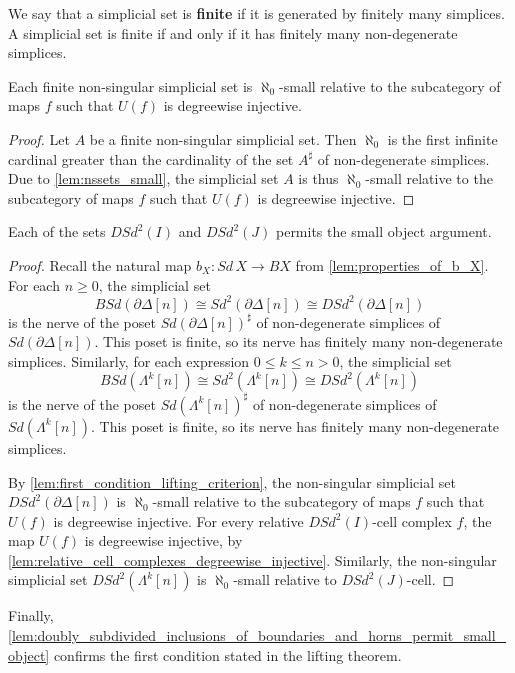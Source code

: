 We say that a simplicial set is \textbf{finite} if it is generated by finitely many simplices. A simplicial set is finite if and only if it has finitely many non-degenerate simplices.
\begin{lemma}\label{lem:first_condition_lifting_criterion}
Each finite non-singular simplicial set is $\aleph _0$-small relative to the subcategory of maps $f$ such that $U(f)$ is degreewise injective.
\end{lemma}
\begin{proof}
Let $A$ be a finite non-singular simplicial set. Then $\aleph _0$ is the first infinite cardinal greater than the cardinality of the set $A^\sharp$ of non-degenerate simplices. Due to \cref{lem:nssets_small}, the simplicial set $A$ is thus $\aleph _0$-small relative to the subcategory of maps $f$ such that $U(f)$ is degreewise injective.
\end{proof}
\begin{lemma}\label{lem:doubly_subdivided_inclusions_of_boundaries_and_horns_permit_small_object}
Each of the sets $DSd^2(I)$ and $DSd^2(J)$ permits the small object argument.
\end{lemma}
\begin{proof}
Recall the natural map $b_X:Sd\, X\to BX$ from \cref{lem:properties_of_b_X}. For each $n\geq 0$, the simplicial set
\[BSd(\partial \Delta [n])\cong Sd^2(\partial \Delta [n])\cong DSd^2(\partial \Delta [n])\]
is the nerve of the poset $Sd(\partial \Delta [n])^\sharp$ of non-degenerate simplices of $Sd(\partial \Delta [n])$. This poset is finite, so its nerve has finitely many non-degenerate simplices. Similarly, for each expression $0\leq k\leq n>0$, the simplicial set
\[BSd(\Lambda ^k[n])\cong Sd^2(\Lambda ^k[n])\cong DSd^2(\Lambda ^k[n])\]
is the nerve of the poset $Sd(\Lambda ^k[n])^\sharp$ of non-degenerate simplices of $Sd(\Lambda ^k[n])$. This poset is finite, so its nerve has finitely many non-degenerate simplices.

By \cref{lem:first_condition_lifting_criterion}, the non-singular simplicial set $DSd^2(\partial \Delta [n])$ is $\aleph _0$-small relative to the subcategory of maps $f$ such that $U(f)$ is degreewise injective. For every relative $DSd^2(I)$-cell complex $f$, the map $U(f)$ is degreewise injective, by \cref{lem:relative_cell_complexes_degreewise_injective}. Similarly, the non-singular simplicial set $DSd^2(\Lambda ^k[n])$ is $\aleph _0$-small relative to $DSd^2(J)$-cell.
\end{proof}
\noindent Finally, \cref{lem:doubly_subdivided_inclusions_of_boundaries_and_horns_permit_small_object} confirms the first condition stated in the lifting theorem.

